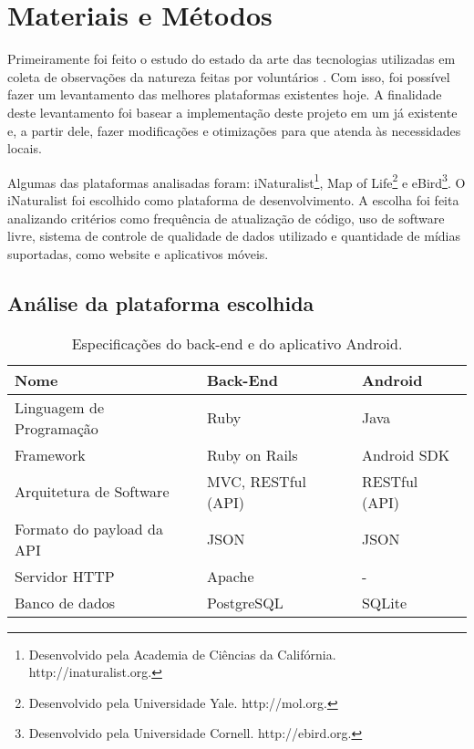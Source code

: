 \section{Materiais e Métodos}
Primeiramente foi feito o estudo do estado da arte das tecnologias utilizadas em coleta de observações da natureza feitas por voluntários \cite{azavea2014, azavea2015}. Com isso, foi possível fazer um levantamento das melhores plataformas existentes hoje. A finalidade deste levantamento foi basear a implementação deste projeto em um já existente e, a partir dele, fazer modificações e otimizações para que atenda às necessidades locais. 

Algumas das plataformas analisadas foram: iNaturalist\footnote{Desenvolvido pela Academia de Ciências da Califórnia. http://inaturalist.org.}, Map of Life\footnote{Desenvolvido pela Universidade Yale. http://mol.org.} e eBird\footnote{Desenvolvido pela Universidade Cornell. http://ebird.org.}. O iNaturalist foi escolhido como plataforma de desenvolvimento. A escolha foi feita analizando critérios como frequência de atualização de código, uso de software livre, sistema de controle de qualidade de dados utilizado e quantidade de mídias suportadas, como website e aplicativos móveis.

\subsection*{Análise da plataforma escolhida}

\begin{table}[h!]
  \centering
  \begin{tabular}{lll}
    \toprule
    \textbf{Nome} & \textbf{Back-End} & \textbf{Android} \\
    \midrule
    Linguagem de Programação  & Ruby                & Java \\
    Framework                 & Ruby on Rails       & Android SDK \\
    Arquitetura de Software   & MVC, RESTful (API)  & RESTful (API) \\
    Formato do payload da API & JSON                & JSON \\
    Servidor HTTP             & Apache              & - \\
    Banco de dados            & PostgreSQL          & SQLite \\
    \bottomrule
  \end{tabular}
  
  \caption{Especificações do back-end e do aplicativo Android.}
  \label{tab:back-end-espec}
\end{table}

